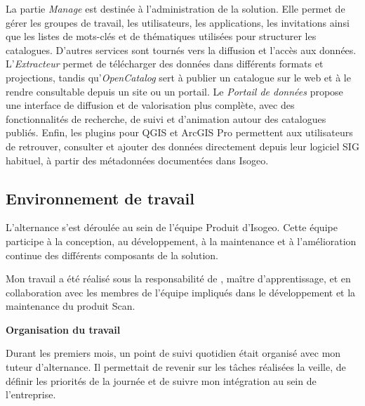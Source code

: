 La partie \textit{Manage} est destinée à l'administration de la solution. Elle
permet de gérer les groupes de travail, les utilisateurs, les applications, les
invitations ainsi que les listes de mots-clés et de thématiques utilisées pour
structurer les catalogues. D'autres services sont tournés vers la diffusion et
l'accès aux données. L'\textit{Extracteur} permet de télécharger des données
dans différents formats et projections, tandis qu'\textit{OpenCatalog} sert à
publier un catalogue sur le web et à le rendre consultable depuis un site ou un
portail. Le \textit{Portail de données} propose une interface de diffusion et
de valorisation plus complète, avec des fonctionnalités de recherche, de suivi
et d'animation autour des catalogues publiés.
Enfin, les plugins pour QGIS et
ArcGIS Pro permettent aux utilisateurs de retrouver, consulter et ajouter des
données directement depuis leur logiciel SIG habituel, à partir des métadonnées
documentées dans Isogeo.




\subsection{Environnement de travail}
\label{subsec:environnement_travail}

L'alternance s'est déroulée au sein de l'équipe Produit d'Isogeo. Cette équipe
participe à la conception, au développement, à la maintenance et à
l'amélioration continue des différents composants de la solution.

Mon travail a été réalisé sous la responsabilité de
\ReportCompanyTutor, maître d'apprentissage, et en collaboration avec les
membres de l'équipe impliqués dans le développement et la maintenance du
produit Scan.


\medskip

\noindent
\textbf{Organisation du travail}

\medskip

Durant les premiers mois, un point de suivi quotidien était organisé avec mon
tuteur d'alternance. Il permettait de revenir sur les tâches réalisées la
veille, de définir les priorités de la journée et de suivre mon intégration au
sein de l'entreprise.

